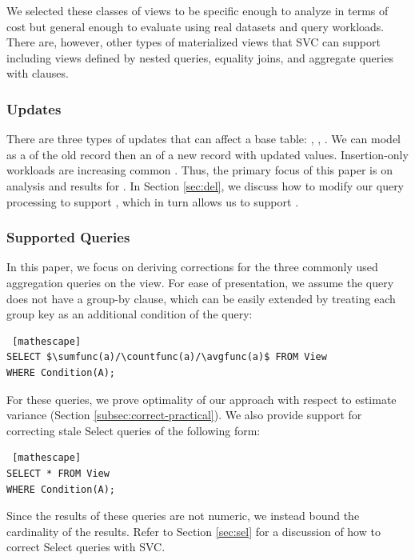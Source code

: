 \vspace{0.5em}

We selected these classes of views to be specific enough to analyze in terms of cost but general enough to evaluate using real datasets and query workloads.
There are, however, other types of materialized views that SVC can support including views defined by nested queries, equality joins, and aggregate queries with \havingfunc clauses.

\subsubsection{Updates}
There are three types of updates that can affect a base table: \insertion, \delete, \update.
We can model \update as a \delete of the old record then an \insertion of a new record with updated values. 
Insertion-only workloads are increasing common .
Thus, the primary focus of this paper is on analysis and results for \insertion. In Section \ref{sec:del}, we discuss how to modify our query processing to support \delete, which in turn allows us to support \update.

\subsubsection{Supported Queries} \label{subsubsec:queries}
In this paper, we focus on deriving corrections for the three commonly used aggregation queries on the view.
For ease of presentation, we assume the query does not have a group-by clause, which can be easily extended by treating each group key as an additional condition of the query: 
\begin{lstlisting} [mathescape]
SELECT $\sumfunc(a)/\countfunc(a)/\avgfunc(a)$ FROM View 
WHERE Condition(A);
\end{lstlisting}
For these queries, we prove optimality of our approach with respect to estimate variance (Section \ref{subsec:correct-practical}). 
We also provide support for correcting stale Select queries of the following form:
\begin{lstlisting} [mathescape]
SELECT * FROM View 
WHERE Condition(A);
\end{lstlisting}
Since the results of these queries are not numeric, we instead bound the cardinality of the results.
Refer to Section \ref{sec:sel} for a discussion of how to correct Select queries with SVC. 



